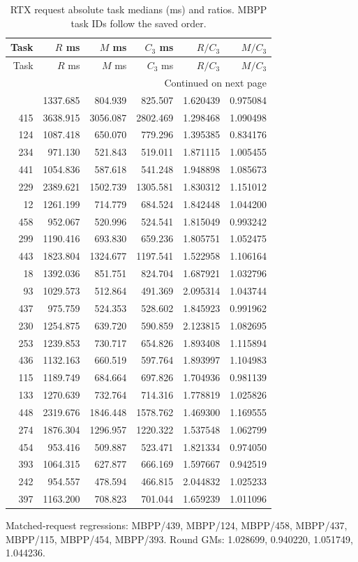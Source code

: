 \begingroup\small
\begin{longtable}{@{}rrrrrr@{}}
\caption{RTX request absolute task medians (ms) and ratios. MBPP task IDs follow the saved order.}\label{tab:rtx_task_request}\\
\toprule
Task & $R$ ms & $M$ ms & $C_3$ ms & $R/C_3$ & $M/C_3$\\\midrule
\endfirsthead
\toprule
Task & $R$ ms & $M$ ms & $C_3$ ms & $R/C_3$ & $M/C_3$\\\midrule
\endhead
\midrule\multicolumn{6}{r}{Continued on next page}\\
\endfoot
\bottomrule
\endlastfoot
439 & 1337.685 & 804.939 & 825.507 & 1.620439 & 0.975084\\
415 & 3638.915 & 3056.087 & 2802.469 & 1.298468 & 1.090498\\
124 & 1087.418 & 650.070 & 779.296 & 1.395385 & 0.834176\\
234 & 971.130 & 521.843 & 519.011 & 1.871115 & 1.005455\\
441 & 1054.836 & 587.618 & 541.248 & 1.948898 & 1.085673\\
229 & 2389.621 & 1502.739 & 1305.581 & 1.830312 & 1.151012\\
12 & 1261.199 & 714.779 & 684.524 & 1.842448 & 1.044200\\
458 & 952.067 & 520.996 & 524.541 & 1.815049 & 0.993242\\
299 & 1190.416 & 693.830 & 659.236 & 1.805751 & 1.052475\\
443 & 1823.804 & 1324.677 & 1197.541 & 1.522958 & 1.106164\\
18 & 1392.036 & 851.751 & 824.704 & 1.687921 & 1.032796\\
93 & 1029.573 & 512.864 & 491.369 & 2.095314 & 1.043744\\
437 & 975.759 & 524.353 & 528.602 & 1.845923 & 0.991962\\
230 & 1254.875 & 639.720 & 590.859 & 2.123815 & 1.082695\\
253 & 1239.853 & 730.717 & 654.826 & 1.893408 & 1.115894\\
436 & 1132.163 & 660.519 & 597.764 & 1.893997 & 1.104983\\
115 & 1189.749 & 684.664 & 697.826 & 1.704936 & 0.981139\\
133 & 1270.639 & 732.764 & 714.316 & 1.778819 & 1.025826\\
448 & 2319.676 & 1846.448 & 1578.762 & 1.469300 & 1.169555\\
274 & 1876.304 & 1296.957 & 1220.322 & 1.537548 & 1.062799\\
454 & 953.416 & 509.887 & 523.471 & 1.821334 & 0.974050\\
393 & 1064.315 & 627.877 & 666.169 & 1.597667 & 0.942519\\
242 & 954.557 & 478.594 & 466.815 & 2.044832 & 1.025233\\
397 & 1163.200 & 708.823 & 701.044 & 1.659239 & 1.011096\\
\end{longtable}
Matched-request regressions: MBPP/439, MBPP/124, MBPP/458, MBPP/437, MBPP/115, MBPP/454, MBPP/393. Round GMs: 1.028699, 0.940220, 1.051749, 1.044236.
\endgroup
